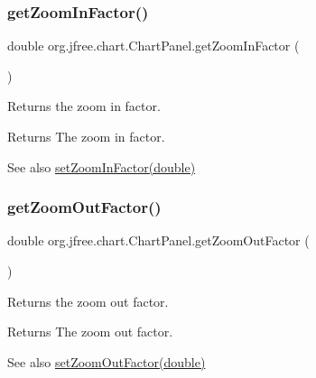 \subsubsection{\texorpdfstring{get\+Zoom\+In\+Factor()}{getZoomInFactor()}}
{\footnotesize\ttfamily double org.\+jfree.\+chart.\+Chart\+Panel.\+get\+Zoom\+In\+Factor (\begin{DoxyParamCaption}{ }\end{DoxyParamCaption})}

Returns the zoom in factor.

\begin{DoxyReturn}{Returns}
The zoom in factor.
\end{DoxyReturn}
\begin{DoxySeeAlso}{See also}
\mbox{\hyperlink{classorg_1_1jfree_1_1chart_1_1_chart_panel_a625413df0991bdbdbe999f73f30f2fd3}{set\+Zoom\+In\+Factor(double)}} 
\end{DoxySeeAlso}
\mbox{\label{classorg_1_1jfree_1_1chart_1_1_chart_panel_a5cd5ea564c46614edff846c7c0afbb9d}} 
\subsubsection{\texorpdfstring{get\+Zoom\+Out\+Factor()}{getZoomOutFactor()}}
{\footnotesize\ttfamily double org.\+jfree.\+chart.\+Chart\+Panel.\+get\+Zoom\+Out\+Factor (\begin{DoxyParamCaption}{ }\end{DoxyParamCaption})}

Returns the zoom out factor.

\begin{DoxyReturn}{Returns}
The zoom out factor.
\end{DoxyReturn}
\begin{DoxySeeAlso}{See also}
\mbox{\hyperlink{classorg_1_1jfree_1_1chart_1_1_chart_panel_a138eceeb021b5e8c28c829bb5c3cb0e4}{set\+Zoom\+Out\+Factor(double)}} 
\end{DoxySeeAlso}
\mbox{\label{classorg_1_1jfree_1_1chart_1_1_chart_panel_a2db2a730b563e5e3145d11985beb23df}} 
